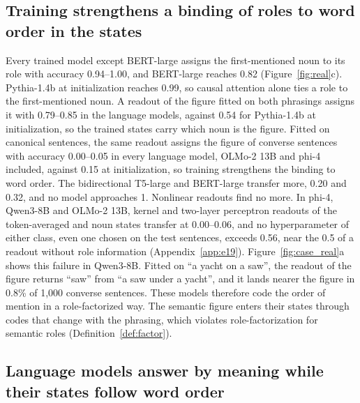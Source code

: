 \documentclass[10pt]{article}
\theoremstyle{plain}
\theoremstyle{remark}
\begin{document}
\subsection{Training strengthens a binding of roles to word order in the states}
\label{sec:roles}

Every trained model except BERT-large assigns the first-mentioned noun to its role with accuracy 0.94--1.00, and BERT-large reaches 0.82 (Figure~\ref{fig:real}c). Pythia-1.4b at initialization reaches 0.99, so causal attention alone ties a role to the first-mentioned noun. A readout of the figure fitted on both phrasings assigns it with 0.79--0.85 in the language models, against 0.54 for Pythia-1.4b at initialization, so the trained states carry which noun is the figure. Fitted on canonical sentences, the same readout assigns the figure of converse sentences with accuracy 0.00--0.05 in every language model, OLMo-2 13B and phi-4 included, against 0.15 at initialization, so training strengthens the binding to word order. The bidirectional T5-large and BERT-large transfer more, 0.20 and 0.32, and no model approaches 1. Nonlinear readouts find no more. In phi-4, Qwen3-8B and OLMo-2 13B, kernel and two-layer perceptron readouts of the token-averaged and noun states transfer at 0.00--0.06, and no hyperparameter of either class, even one chosen on the test sentences, exceeds 0.56, near the 0.5 of a readout without role information (Appendix~\ref{app:e19}). Figure~\ref{fig:case_real}a shows this failure in Qwen3-8B. Fitted on ``a yacht on a saw'', the readout of the figure returns ``saw'' from ``a saw under a yacht'', and it lands nearer the figure in 0.8\% of 1{,}000 converse sentences. These models therefore code the order of mention in a role-factorized way. The semantic figure enters their states through codes that change with the phrasing, which violates role-factorization for semantic roles (Definition~\ref{def:factor}).

\subsection{Language models answer by meaning while their states follow word order}
\label{sec:behavior}
\end{document}
